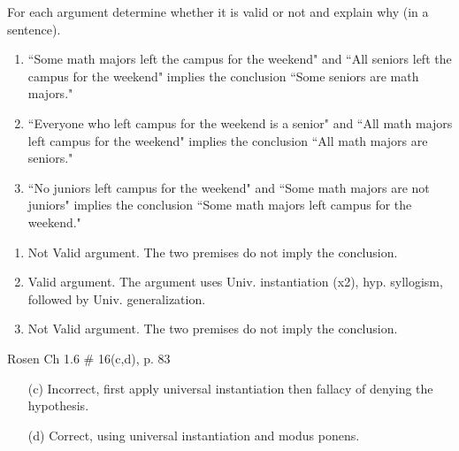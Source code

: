 \begin{questions}
 For each argument determine whether it is valid or not and explain why (in a sentence).
    \begin{enumerate}[label=(\alph*),itemsep=0pt,parsep=0pt,topsep=0pt,partopsep=0pt]
    \item ``Some math majors left the campus for the weekend" and ``All seniors left the campus for the weekend" implies the conclusion ``Some seniors are math majors."
    \item ``Everyone who left campus for the weekend is a senior" and ``All math majors left campus for the weekend"  implies the conclusion ``All math majors are seniors." 
    \item ``No juniors left campus for the weekend" and ``Some math majors are not juniors" implies the conclusion ``Some math majors left campus for the weekend."
    \end{enumerate}
   \ifprintanswers
        \vspace{-10pt}
    \fi
\begin{solution}
    \begin{enumerate}[label=(\alph*),itemsep=0pt,parsep=0pt,topsep=0pt,partopsep=0pt]
        \item Not Valid argument.  The two premises do not imply the conclusion.
        \item Valid argument. The argument uses Univ. instantiation (x2), hyp. syllogism, followed by Univ. generalization.
        \item Not Valid argument.  The two premises do not imply the conclusion.
    \end{enumerate}
\end{solution}



 Rosen Ch 1.6 \# 16(c,d), p. 83
    \ifprintanswers
        \vspace{-15pt}
    \fi
\begin{solution}
    \begin{itemize}[itemsep=0pt,parsep=0pt,topsep=0pt,partopsep=0pt]
        \item[(c)] Incorrect, first apply universal instantiation then fallacy of denying the hypothesis.
       \item[(d)] Correct, using universal instantiation and modus ponens.
    \end{itemize}
\end{solution}




\end{questions}
